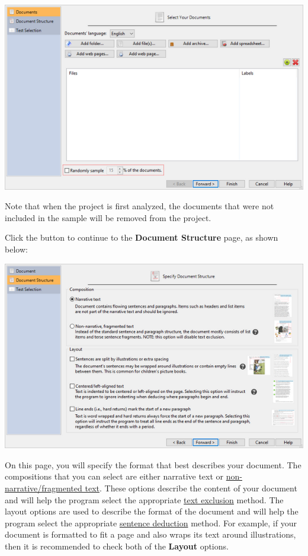 \documentclass[
]{book}
\theoremstyle{definition}
\theoremstyle{definition}
\theoremstyle{definition}
\theoremstyle{definition}
\theoremstyle{remark}
\begin{document}
\includegraphics{Images/randomsample.png}

Note that when the project is first analyzed, the documents that were not included in the sample will be removed from the project.

Click the  button to continue to the \textbf{Document Structure} page, as shown below:

\includegraphics{Images/wizarddocstructure.png}

On this page, you will specify the format that best describes your document. The compositions that you can select are either narrative text or \protect\hyperlink{framented-text}{non-narrative/fragmented text}. These options describe the content of your document and will help the program select the appropriate \protect\hyperlink{options-text-exclusion}{text exclusion} method. The layout options are used to describe the format of the document and will help the program select the appropriate \protect\hyperlink{options-sentence-deduction}{sentence deduction} method. For example, if your document is formatted to fit a page and also wraps its text around illustrations, then it is recommended to check both of the \textbf{Layout} options.
\end{document}
